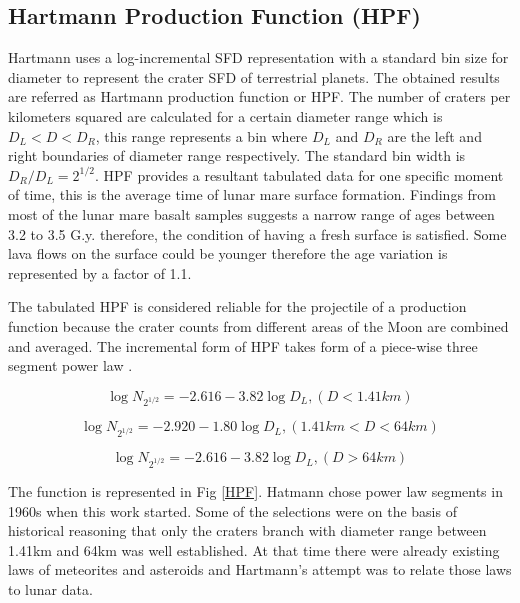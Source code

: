 \documentclass[11pt]{article}
\begin{document}
\subsection{Hartmann Production Function (HPF)}
Hartmann uses a log-incremental SFD representation with a standard bin size for diameter to represent the crater SFD of terrestrial planets. The obtained results are referred as Hartmann production function or HPF. The number of craters per kilometers squared are calculated for a certain diameter range which is $D_{L} < D < D_{R}$, this range represents a bin where $D_{L}$ and $D_{R}$ are the left and right boundaries of diameter range respectively. The standard bin width is $D_{R}/D_{L} = 2^{1/2}$. HPF provides a resultant tabulated data for one specific moment of time, this is the average time of lunar mare surface formation. Findings from most of the lunar mare basalt samples suggests a narrow range of ages between 3.2 to 3.5 G.y. \cite{stoffler2001stratigraphy} therefore, the condition of having a fresh surface is satisfied. Some lava flows on the surface could be younger \cite{hiesinger2000ages} therefore the age variation is represented by a factor of 1.1.

The tabulated HPF is considered reliable for the projectile of a production function because the crater counts from different areas of the Moon are combined and averaged. The incremental form of HPF takes form of a piece-wise three segment power law \cite{ivanov2002comparison}.

\begin{equation}
\log N_{2^{1/2}} = -2.616 - 3.82 \log D_{L}, (D<1.41km)
\end{equation}

\begin{equation}
\log N_{2^{1/2}} = -2.920 - 1.80 \log D_{L},
(1.41km < D < 64km)
\end{equation}

\begin{equation}
\log N_{2^{1/2}} = -2.616 - 3.82 \log D_{L},
(D>64km)
\end{equation}

The function is represented in Fig \ref{HPF}. Hatmann chose power law segments in 1960s when this work started. Some of the selections were on the basis of historical reasoning that only the craters branch with diameter range between 1.41km and 64km was well established. At that time there were already existing laws of meteorites and asteroids and Hartmann's attempt was to relate those laws to lunar data.
\end{document}
